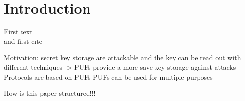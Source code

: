 \chapter{Introduction}

First text\\
and first cite \cite{Morozov2010AnFPGA}

Motivation: secret key storage are attackable and the key can be read out with different techniques
-> PUFs provide a more save key storage against attacks
Protocols are based on PUFs
PUFs can be used for multiple purposes

How is this paper structured!!!